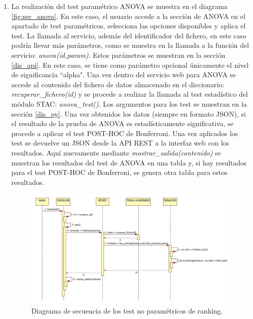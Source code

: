 \begin{enumerate}
\item La realización del test paramétrico ANOVA se muestra en el diagrama \ref{fig:sec_anova}. En este caso, el usuario accede a la sección de ANOVA en el apartado de test paramétricos, selecciona las opciones disponibles y aplica el test. La llamada al servicio, además del identificador del fichero, en este caso podría llevar más parámetros, como se muestra en la llamada a la función del servicio: \textit{anova(id,param)}. Estos parámetros se muestran en la sección \ref{dis_api}. En este caso, se tiene como parámetro opcional únicamente el nivel de significancia ``alpha". Una vez dentro del servicio web para ANOVA se accede al contenido del fichero de datos almacenado en el diccionario: \textit{recuperar\_fichero(id)} y se procede a realizar la llamada al test estadístico del módulo STAC: \textit{anova\_test()}. Los argumentos para los test se muestran en la sección \ref{dis_py}. Una vez obtenidos los datos (siempre en formato JSON), si el resultado de la prueba de ANOVA es estadísticamente significativa, se procede a aplicar el test POST-HOC de Bonferroni. Una vez aplicados los test se devuelve un JSON desde la API REST a la interfaz web con los resultados. Aquí nuevamente mediante \textit{mostrar\_salida(contenido)} se muestran los resultados del test de ANOVA en una tabla y, si hay resultados para el test POST-HOC de Bonferroni, se genera otra tabla para estos resultados.

\begin{figure}[H]
\centering
\begin{adjustwidth}{-5em}{-5em}
\includegraphics[scale=0.5]{figuras/sec_ranking.jpg}
\caption{Diagrama de secuencia de los test no paramétricos de ranking.}
\label{fig:sec_ranking}
\end{adjustwidth}
\end{figure}


\end{enumerate}
